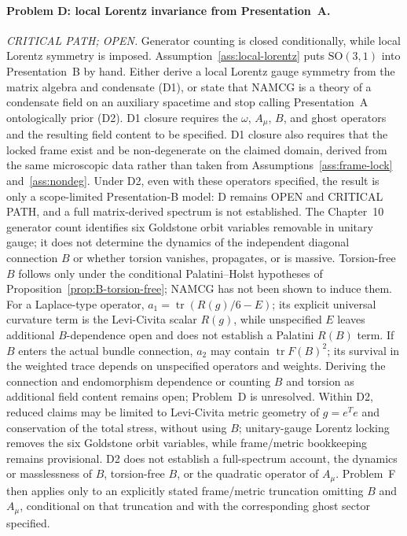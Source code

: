 \paragraph{Problem D: local Lorentz invariance from Presentation~A.}
\emph{CRITICAL PATH; OPEN.} Generator counting is closed
conditionally, while local Lorentz symmetry is imposed.
Assumption~\ref{ass:local-lorentz} puts
\(\mathrm{SO}(3,1)\) into Presentation~B by hand. Either derive a
local Lorentz gauge symmetry from the matrix algebra and condensate
(D1), or state that NAMCG is a theory of a condensate field on an
auxiliary spacetime and stop calling Presentation~A ontologically
prior (D2). D1 closure requires the \(\omega\), \(A_\mu\), \(B\), and
ghost operators and the resulting field content to be specified.
D1 closure also requires that the locked frame exist and be
non-degenerate on the claimed domain, derived from the same
microscopic data rather than taken from
Assumptions~\ref{ass:frame-lock} and~\ref{ass:nondeg}.
Under D2, even with these operators specified, the result is only a
scope-limited Presentation-B model: D remains OPEN and CRITICAL PATH,
and a full matrix-derived spectrum is not established. The Chapter~10
generator count identifies six
Goldstone orbit variables removable in unitary gauge; it does not
determine the dynamics of the independent diagonal connection \(B\)
or whether torsion vanishes, propagates, or is massive. Torsion-free
\(B\) follows only under the conditional Palatini--Holst hypotheses
of Proposition~\ref{prop:B-torsion-free}; NAMCG has not been shown
to induce them. For a Laplace-type operator,
\(a_1=\operatorname{tr}(R(g)/6-E)\); its explicit universal
curvature term is the Levi-Civita scalar \(R(g)\), while unspecified
\(E\) leaves additional \(B\)-dependence open and does not establish
a Palatini \(R(B)\) term. If \(B\) enters the actual bundle
connection, \(a_2\) may contain \(\operatorname{tr}F(B)^2\); its
survival in the weighted trace depends on unspecified operators and
weights. Deriving the connection and endomorphism dependence or
counting \(B\) and torsion as additional field content remains open;
Problem~D is unresolved.
Within D2, reduced claims may be limited to Levi-Civita metric
geometry of \(g=e^T e\) and conservation of the total stress, without
using \(B\); unitary-gauge Lorentz locking removes the six Goldstone
orbit variables, while frame/metric bookkeeping remains provisional.
D2 does not establish a full-spectrum account, the dynamics or
masslessness of \(B\), torsion-free \(B\), or the quadratic operator
of \(A_\mu\). Problem~F then applies only to an explicitly stated
frame/metric truncation omitting \(B\) and \(A_\mu\), conditional on
that truncation and with the corresponding ghost sector specified.


